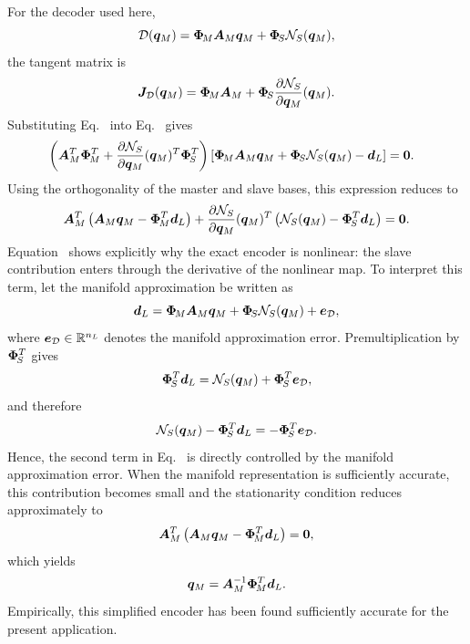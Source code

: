 \documentclass[11pt,a4paper]{article}
\begin{document}
\noindent For the decoder used here,
\[
    \mathcal{\boldsymbol{D}}(\bm{q}_M)
    =
    \bm{\Phi}_{\!M}\bm{A}_{M}\bm{q}_M+\bm{\Phi}_{\!S}\mathcal{N}_{S}(\bm{q}_M),
\]
the tangent matrix is
\begin{equation}
\label{eq:Jdec_master_slave}
    \bm{J}_{\mathcal{D}}(\bm{q}_M)
    =
    \bm{\Phi}_{\!M}\bm{A}_{M}
    +
    \bm{\Phi}_{\!S}
    \dfrac{\partial \mathcal{N}_{S}}{\partial \bm{q}_M}(\bm{q}_M).
\end{equation}
Substituting Eq.~ into
Eq.~ gives
\begin{equation}
\label{eq:encoder_normal_expanded}
\begin{aligned}
&
\left(
    \bm{A}_{M}^T\bm{\Phi}_{\!M}^T
    +
    \dfrac{\partial \mathcal{N}_{S}}{\partial \bm{q}_M}(\bm{q}_M)^T\bm{\Phi}_{\!S}^T
\right)
\left[
    \bm{\Phi}_{\!M}\bm{A}_{M}\bm{q}_M
    +
    \bm{\Phi}_{\!S}\mathcal{N}_{S}(\bm{q}_M)
    -
    \bm{d}_L
\right]
=
\bm{0}.
\end{aligned}
\end{equation}
Using the orthogonality of the master and slave bases, this expression reduces
to
\begin{equation}
\label{eq:encoder_normal_split}
    \bm{A}_{M}^T
    \left(
        \bm{A}_{M}\bm{q}_M-\bm{\Phi}_{\!M}^T\bm{d}_L
    \right)
    +
    \dfrac{\partial \mathcal{N}_{S}}{\partial \bm{q}_M}(\bm{q}_M)^T
    \left(
        \mathcal{N}_{S}(\bm{q}_M)-\bm{\Phi}_{\!S}^T\bm{d}_L
    \right)
    =
    \bm{0}.
\end{equation}
Equation~ shows explicitly why the exact
encoder is nonlinear: the slave contribution enters through the derivative of
the nonlinear map. To interpret this term, let the manifold approximation be
written as
\begin{equation}
\label{eq:decoder_with_error}
    \bm{d}_L
    =
    \bm{\Phi}_{\!M}\bm{A}_{M}\bm{q}_M
    +
    \bm{\Phi}_{\!S}\mathcal{N}_{S}(\bm{q}_M)
    +
    \bm{e}_{\mathcal{D}} ,
\end{equation}
where $\bm{e}_{\mathcal{D}}\in\mathbb{R}^{n_L}$ denotes the manifold approximation error.
Premultiplication by $\bm{\Phi}_{\!S}^T$ gives
\[
    \bm{\Phi}_{\!S}^T\bm{d}_L
    =
    \mathcal{N}_{S}(\bm{q}_M)
    +
    \bm{\Phi}_{\!S}^T\bm{e}_{\mathcal{D}} ,
\]
and therefore
\[
    \mathcal{N}_{S}(\bm{q}_M)-\bm{\Phi}_{\!S}^T\bm{d}_L
    =
    -\bm{\Phi}_{\!S}^T\bm{e}_{\mathcal{D}} .
\]
Hence, the second term in Eq.~ is directly
controlled by the manifold approximation error. When the manifold
representation is sufficiently accurate, this contribution becomes small and
the stationarity condition reduces approximately to
\[
    \bm{A}_{M}^T
    \left(
        \bm{A}_{M}\bm{q}_M-\bm{\Phi}_{\!M}^T\bm{d}_L
    \right)
    =
    \bm{0},
\]
which yields
\begin{equation}
\label{eq:encoder_explicit}
    \bm{q}_M
    =
    \bm{A}_{M}^{-1}\bm{\Phi}_{\!M}^T\bm{d}_L .
\end{equation}
Empirically, this simplified encoder has been found sufficiently accurate for
the present application.
\end{document}
